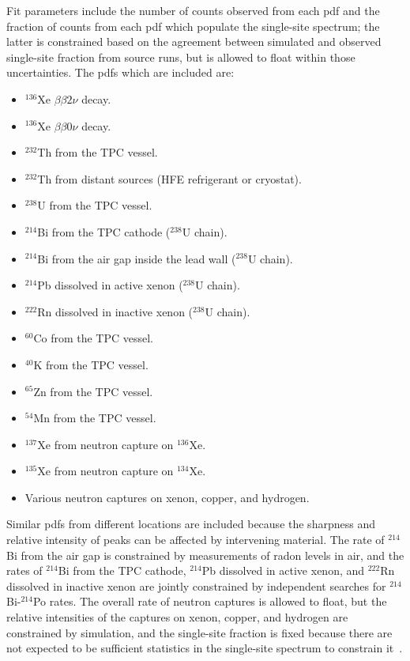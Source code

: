 Fit parameters include the number of counts observed from each pdf and the fraction of counts from each pdf which populate the single-site spectrum; the latter is constrained based on the agreement between simulated and observed single-site fraction from source runs, but is allowed to float within those uncertainties.  The pdfs which are included are:
\begin{itemize}
\item $^{136}$Xe $\beta\beta 2\nu$ decay.
\item $^{136}$Xe $\beta\beta 0\nu$ decay.
\item $^{232}$Th from the TPC vessel.
\item $^{232}$Th from distant sources (HFE refrigerant or cryostat).
\item $^{238}$U from the TPC vessel.
\item $^{214}$Bi from the TPC cathode ($^{238}$U chain).
\item $^{214}$Bi from the air gap inside the lead wall ($^{238}$U chain).
\item $^{214}$Pb dissolved in active xenon ($^{238}$U chain).
\item $^{222}$Rn dissolved in inactive xenon ($^{238}$U chain).
\item $^{60}$Co from the TPC vessel.
\item $^{40}$K from the TPC vessel.
\item $^{65}$Zn from the TPC vessel.
\item $^{54}$Mn from the TPC vessel.
\item $^{137}$Xe from neutron capture on $^{136}$Xe.
\item $^{135}$Xe from neutron capture on $^{134}$Xe.
\item Various neutron captures on xenon, copper, and hydrogen.
\end{itemize}
Similar pdfs from different locations are included because the sharpness and relative intensity of peaks can be affected by intervening material.  The rate of $^{214}$Bi from the air gap is constrained by measurements of radon levels in air, and the rates of $^{214}$Bi from the TPC cathode, $^{214}$Pb dissolved in active xenon, and $^{222}$Rn dissolved in inactive xenon are jointly constrained by independent searches for $^{214}$Bi-$^{214}$Po rates.  The overall rate of neutron captures is allowed to float, but the relative intensities of the captures on xenon, copper, and hydrogen are constrained by simulation, and the single-site fraction is fixed because there are not expected to be sufficient statistics in the single-site spectrum to constrain it~\cite{FittingDocument}.

